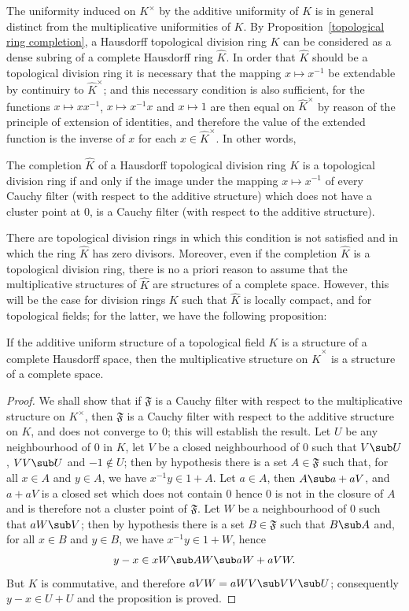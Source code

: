 The uniformity induced on $K^\times$ by the additive uniformity of $K$ is in general distinct from the multiplicative uniformities of $K$. By Proposition~\ref{topological ring completion}, a Hausdorff topological division ring $K$ can be considered as a dense subring of a complete Hausdorff ring $\widehat{K}$. In order that $\widehat{K}$ should be a topological division ring it is necessary that the mapping $x\mapsto x^{-1}$ be extendable by continuiry to $\widehat{K}^\times$; and this necessary condition is also sufficient, for the functions $x\mapsto xx^{-1}$, $x\mapsto x^{-1}x$ and $x\mapsto 1$ are then equal on $\widehat{K}^\times$ by reason of the principle of extension of identities, and therefore the value of the extended function is the inverse of $x$ for each $x\in\widehat{K}^\times$. In other words,
\begin{proposition}\label{topological division ring completion iff}
The completion $\widehat{K}$ of a Hausdorff topological division ring $K$ is a topological division ring if and only if the image under the mapping $x\mapsto x^{-1}$ of every Cauchy filter (with respect to the additive structure) which does not have a cluster point at $0$, is a Cauchy filter (with respect to the additive structure).
\end{proposition}
There are topological division rings in which this condition is not satisfied and in which the ring $\widehat{K}$ has zero divisors. Moreover, even if the completion $\widehat{K}$ is a topological division ring, there is no a priori reason to assume that the multiplicative structures of $\widehat{K}$ are structures of a complete space. However, this will be the case for division rings $K$ such that $\widehat{K}$ is locally compact, and for topological fields; for the latter, we have the following proposition:
\begin{proposition}
If the additive uniform structure of a topological field $K$ is a structure of a complete Hausdorff space, then the multiplicative structure on $\widehat{K}^\times$ is a structure of a complete space.
\end{proposition}
\begin{proof}
We shall show that if $\mathfrak{F}$ is a Cauchy filter with respect to the multiplicative structure on $K^\times$, then $\mathfrak{F}$ is a Cauchy filter with respect to the additive structure on $K$, and does not converge to $0$; this will establish the result. Let $U$ be any neighbourhood of $0$ in $K$, let $V$ be a closed neighbourhood of $0$ such that $V\sub U$, $VV\sub U$ and $-1\notin U$; then by hypothesis there is a set $A\in\mathfrak{F}$ such that, for all $x\in A$ and $y\in A$, we have $x^{-1}y\in 1+A$. Let $a\in A$, then $A\sub a+aV$, and $a+aV$ is a closed set which does not contain $0$ hence $0$ is not in the closure of $A$ and is therefore not a cluster point of $\mathfrak{F}$. Let $W$ be a neighbourhood of $0$ such that $aW\sub V$; then by hypothesis there is a set $B\in\mathfrak{F}$ such that $B\sub A$ and, for all $x\in B$ and $y\in B$, we have $x^{-1}y\in 1+W$, hence
\[y-x\in xW\sub AW\sub aW+aVW.\]
But $K$ is commutative, and therefore $aVW=aWV\sub VV\sub U$; consequently $y-x\in U+U$ and the proposition is proved.
\end{proof}
